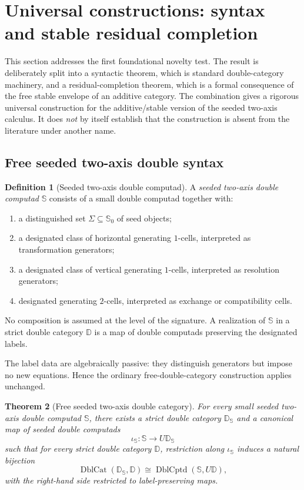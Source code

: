 \documentclass[11pt]{article}
\newtheorem{theorem}{Theorem}[section]
\theoremstyle{definition}
\newtheorem{definition}[theorem]{Definition}
\theoremstyle{remark}
\newcommand{\Seeds}{\Sigma}
\begin{document}
\section{Universal constructions: syntax and stable residual completion}\label{sec:universal}

This section addresses the first foundational novelty test. The result is deliberately split into a syntactic theorem, which is standard double-category machinery, and a residual-completion theorem, which is a formal consequence of the free stable envelope of an additive category. The combination gives a rigorous universal construction for the additive/stable version of the seeded two-axis calculus. It does \emph{not} by itself establish that the construction is absent from the literature under another name.

\subsection{Free seeded two-axis double syntax}

\begin{definition}[Seeded two-axis double computad]\label{def:twoaxis-computad}
A \emph{seeded two-axis double computad} $\mathbb S$ consists of a small double computad together with:
\begin{enumerate}
    \item a distinguished set $\Seeds\subseteq \mathbb S_0$ of seed objects;
    \item a designated class of horizontal generating $1$-cells, interpreted as transformation generators;
    \item a designated class of vertical generating $1$-cells, interpreted as resolution generators;
    \item designated generating $2$-cells, interpreted as exchange or compatibility cells.
\end{enumerate}
No composition is assumed at the level of the signature. A realization of $\mathbb S$ in a strict double category $\mathbb D$ is a map of double computads preserving the designated labels.
\end{definition}

The label data are algebraically passive: they distinguish generators but impose no new equations. Hence the ordinary free-double-category construction applies unchanged.

\begin{theorem}[Free seeded two-axis double category]\label{thm:free-double}
For every small seeded two-axis double computad $\mathbb S$, there exists a strict double category $\mathbb D_{\mathbb S}$ and a canonical map of seeded double computads
\[
\iota_{\mathbb S}:\mathbb S\longrightarrow U\mathbb D_{\mathbb S}
\]
such that for every strict double category $\mathbb D$, restriction along $\iota_{\mathbb S}$ induces a natural bijection
\[
\operatorname{DblCat}(\mathbb D_{\mathbb S},\mathbb D)
\cong
\operatorname{DblCptd}(\mathbb S,U\mathbb D),
\]
with the right-hand side restricted to label-preserving maps.
\end{theorem}
\end{document}
